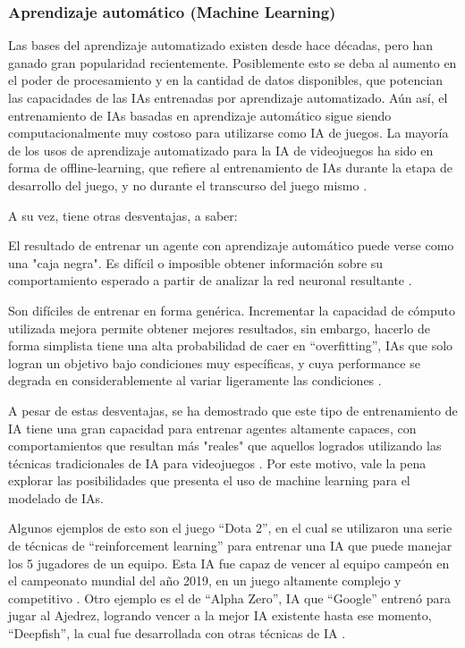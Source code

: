 \documentclass[a4paper]{article}
\begin{document}
\subsubsection{Aprendizaje automático (Machine Learning)}

Las bases del aprendizaje automatizado existen desde hace décadas, pero han ganado gran popularidad recientemente. Posiblemente esto se deba al aumento en el poder de procesamiento y en la cantidad de datos disponibles, que potencian las capacidades de las IAs entrenadas por aprendizaje automatizado. Aún así, el entrenamiento de IAs basadas en aprendizaje automático sigue siendo computacionalmente muy costoso para utilizarse como IA de juegos. La mayoría de los usos de aprendizaje automatizado para la IA de videojuegos ha sido en forma de offline-learning, que refiere al entrenamiento de IAs durante la etapa de desarrollo del juego, y no durante el transcurso del juego mismo \cite{machine_learning_in_digital_games:_a_survey}.

A su vez, tiene otras desventajas, a saber:

El resultado de entrenar un agente con aprendizaje automático puede verse como una "caja negra". Es difícil o imposible obtener información sobre su comportamiento esperado a partir de analizar la red neuronal resultante \cite{deep_learning_black_box_problem}.

Son difíciles de entrenar en forma genérica. Incrementar la capacidad de cómputo utilizada mejora permite obtener mejores resultados, sin embargo, hacerlo de forma simplista tiene una alta probabilidad de caer en “overfitting”, IAs que solo logran un objetivo bajo condiciones muy específicas, y cuya performance se degrada en considerablemente al variar ligeramente las condiciones \cite{an_evaluation_of_the_unity_machine_learning_agents_toolkit}.

A pesar de estas desventajas, se ha demostrado que este tipo de entrenamiento de IA tiene una gran capacidad para entrenar agentes altamente capaces, con comportamientos que resultan más "reales" que aquellos logrados utilizando las técnicas tradicionales de IA para videojuegos \cite{a_study_on_overfitting_in_deep_reinforcement_learning}. Por este motivo, vale la pena explorar las posibilidades que presenta el uso de machine learning para el modelado de IAs.

Algunos ejemplos de esto son el juego “Dota 2”, en el cual se utilizaron una serie de técnicas de “reinforcement learning” para entrenar una IA que puede manejar los 5 jugadores de un equipo. Esta IA fue capaz de vencer al equipo campeón en el campeonato mundial del año 2019, en un juego altamente complejo y competitivo \cite{dota_2_with_large_scale_deep_reinforcement_learning}. Otro ejemplo es el de “Alpha Zero”, IA que “Google” entrenó para jugar al Ajedrez, logrando vencer a la mejor IA existente hasta ese momento, “Deepfish”, la cual fue desarrollada con otras técnicas de IA \cite{ai_in_human-computer_gaming}.
\end{document}

